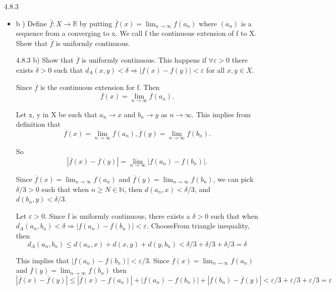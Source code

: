 \documentclass[a4paper,norsk]{article}
\renewcommand{\geq}{\geqslant}
\renewcommand{\leq}{\leqslant}
\renewcommand{\epsilon}{\varepsilon}
\begin{document}
\begin{oppgavebox}{4.8.3}{}
\begin{itemize}
\begin{proofbox}{4.8.3 a)}{}
    

  \end{proofbox}
  \item b ) Define $ \bar{f} : X \to \mathbb{R} $ by putting $ \bar{f}(x) = \lim_{n \to \infty} f(a_n)  $ where $ \left( a_n \right)  $ is a sequence from a converging to x. We call f the continuous extension of f to X. Show that $ \bar{f} $ is uniformly continuous.
  \begin{proofbox}{4.8.3 b)}{}
    Show that $ \overline{f} $ is uniformly continuous. This happens if $ \forall \epsilon > 0 $ there exists $ \delta > 0 $ such that $ d_A \left( x, y \right) < \delta \Rightarrow \left| f(x) - f(y) \right| < \epsilon    $  for all $ x, y \in X $.


    Since $ \overline{f} $ is the continuous extension for f. Then 
    \[
        \overline{f}(x) = \lim_{n \to \infty}  f(a_n).
    \]

    Let x, y in X be such that $ a_n \to x $ and $ b_n \to y $ as $ n \to \infty $. This implies from definition that 
    \[
        \overline{f}(x) = \lim_{n \to \infty} f(a_n), \overline{f}(y) = \lim_{n \to \infty} f(b_n).
    \]
     
    So
    \[
        \left| \overline{f}(x) - \overline{f}(y) \right| = \lim_{n \to \infty} \left| f(a_n) - f(b_n) \right|.
    \]

    Since $ \overline{f}(x) = \lim_{n \to \infty} f(a_n)  $ and $ \overline{f}(y) = \lim_{n \to \infty} f(b_n)  $, we can pick $ \delta /3 > 0$ such that when $ n \geq N \in \mathbb{N} $, then $ d \left( a_n, x \right) < \delta /3  $, and $ d \left( b_n, y \right) < \delta /3 $. 

    Let $ \epsilon > 0 $. Since f is uniformly continuous, there exists a $ \delta > 0 $ such that when $ d_A \left( a_n, b_n \right) < \delta \Rightarrow \left| f(a_n) - f(b_n) \right| < \epsilon $. ChooseFrom triangle inequality, then 
    \[
        d_A \left( a_n, b_n \right) \leq d \left( a_n, x \right) + d \left( x, y \right)  + d \left( y, b_n \right) < \delta/3 + \delta /3 + \delta /3 = \delta 
    \]

    This implies that $ \left| f(a_n) - f(b_n)  \right| < \epsilon/3  $. Since $ \overline{f}(x) = \lim_{n \to \infty}f(a_n)  $ and $ \overline{f}(y)  = \lim_{n \to \infty} f(b_n)  $ then
    \[
        \left| \overline{f}(x) - \overline{f}(y) \right| \leq \left| \overline{f}(x) - f(a_n) \right| + \left| f(a_n) - f(b_n)  \right| + \left| f(b_n) - \overline{f}(y) \right| < \epsilon /3 + \epsilon/3 + \epsilon /3 = \epsilon 
    \]


\end{proofbox}
\end{itemize}
\end{oppgavebox}
\end{document}
